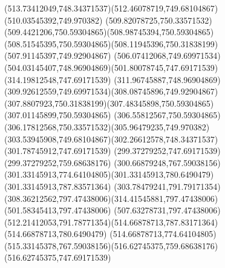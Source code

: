 {{	\curveto(513.73412049,748.34371537)(512.46078719,749.68104867)(510.03545392,749.970382)
	\curveto(509.82078725,750.33571532)(509.4421206,750.59304865)(508.98745394,750.59304865)
	\curveto(508.51545395,750.59304865)(508.11945396,750.31838199)(507.91145397,749.92904867)
	\curveto(506.07412068,749.69971534)(504.03145407,748.96904869)(501.80078745,747.69171539)
	\lineto(314.19812548,747.69171539)
	\curveto(311.96745887,748.96904869)(309.92612559,749.69971534)(308.08745896,749.92904867)
	\curveto(307.8807923,750.31838199)(307.48345898,750.59304865)(307.01145899,750.59304865)
	\curveto(306.55812567,750.59304865)(306.17812568,750.33571532)(305.96479235,749.970382)
	\curveto(303.53945908,749.68104867)(302.26612578,748.34371537)(301.78745912,747.69171539)
	\lineto(299.37279252,747.69171539)
	\lineto(299.37279252,759.68638176)
	\curveto(300.66879248,767.59038156)(301.33145913,774.64104805)(301.33145913,780.6490479)
	\lineto(301.33145913,787.83571364)
	\curveto(303.78479241,791.79171354)(308.36212562,797.47438006)(314.41545881,797.47438006)
	\lineto(501.58345413,797.47438006)
	\curveto(507.63278731,797.47438006)(512.21412053,791.78771354)(514.66878713,787.83171364)
	\lineto(514.66878713,780.6490479)
	\curveto(514.66878713,774.64104805)(515.33145378,767.59038156)(516.62745375,759.68638176)
	\lineto(516.62745375,747.69171539)
	\closepath
}
}
